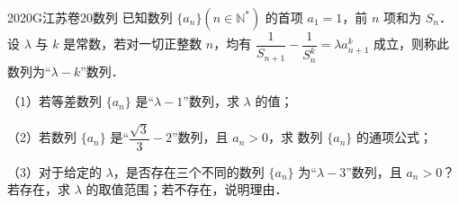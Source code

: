 
\begin{problem}{2020}{G}{江苏卷}{20}{数列}
已知数列 $\{a_n\}(n\in\mathbb{N}^*)$ 的首项 $a_1=1$，前 $n$ 项和为 $S_n$．设 $\lambda$ 与 $k$ 是常数，若对一切正整数 $n$，均有 $\dfrac{1}{S_{n+1}}-\dfrac{1}{S_n^k}=\lambda a_{n+1}^k$ 成立，则称此数列为“$\lambda-k$”数列．

（1）若等差数列 $\{a_n\}$ 是“$\lambda-1$”数列，求 $\lambda$ 的值；

（2）若数列 $\{a_n\}$ 是“$\dfrac{\sqrt{3}}{3}-2$”数列，且 $a_n>0$，求 数列 $\{a_n\}$ 的通项公式；

（3）对于给定的 $\lambda$，是否存在三个不同的数列 $\{a_n\}$ 为“$\lambda-3$”数列，且 $a_n>0$？若存在，求 $\lambda$ 的取值范围；若不存在，说明理由．
\end{problem}